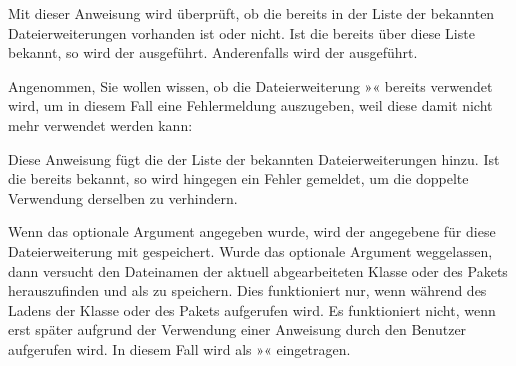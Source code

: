 \begin{Declaration}
\end{Declaration}
Mit dieser Anweisung wird überprüft, ob die  bereits
in der Liste der bekannten Dateierweiterungen vorhanden ist oder nicht. Ist
die  bereits über diese Liste bekannt, so wird der
 ausgeführt. Anderenfalls wird der 
ausgeführt.
\begin{Example}
  Angenommen, Sie wollen wissen, ob die Dateierweiterung »« bereits
  verwendet wird, um in diesem Fall eine Fehlermeldung auszugeben, weil diese
  damit nicht mehr verwendet werden kann:
\begin{lstcode}
\end{lstcode}
\end{Example}
\EndIndexGroup%
\ExampleEndFix


\begin{Declaration}
\end{Declaration}
Diese Anweisung fügt die  der Liste der bekannten
Dateierweiterungen hinzu. Ist die  bereits bekannt, so
wird hingegen ein Fehler gemeldet, um die doppelte Verwendung derselben
 zu verhindern.

Wenn das optionale Argument  angegeben wurde, wird der
angegebene  für diese Dateierweiterung mit gespeichert. Wurde
das optionale Argument weggelassen, dann versucht  den
Dateinamen der aktuell abgearbeiteten Klasse oder des Pakets herauszufinden
und als  zu speichern. Dies funktioniert
nur, wenn  während des Ladens der Klasse oder des Pakets
aufgerufen wird. Es funktioniert nicht, wenn  erst später
aufgrund der Verwendung einer Anweisung durch den Benutzer aufgerufen wird. In
diesem Fall wird als  »« eingetragen. 

